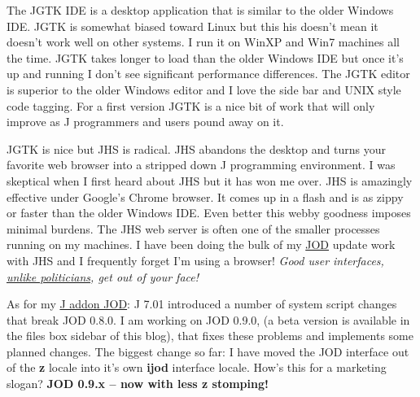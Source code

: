 The JGTK IDE is a desktop application that is similar to the older
Windows IDE. JGTK is somewhat biased toward Linux but this his doesn't
mean it doesn't work well on other systems. I run it on WinXP and Win7
machines all the time. JGTK takes longer to load than the older Windows
IDE but once it's up and running I don't see significant performance
differences. The JGTK editor is superior to the older Windows editor and
I love the side bar and UNIX style code tagging. For a first version
JGTK is a nice bit of work that will only improve as J programmers and
users pound away on it.

JGTK is nice but JHS is radical. JHS abandons the desktop and turns your
favorite web browser into a stripped down J programming environment. I
was skeptical when I first heard about JHS but it has won me over. JHS
is amazingly effective under Google's Chrome browser. It comes up in a
flash and is as zippy or faster than the older Windows IDE. Even better
this webby goodness imposes minimal burdens. The JHS web server is often
one of the smaller processes running on my machines. I have been doing
the bulk of my
\href{https://github.com/bakerjd99/jod/blob/master/joddocument/pdfdoc/jod.pdf}{JOD}
update work with JHS and I frequently forget I'm using a browser!
\emph{Good user
interfaces,} \emph{\href{http://www.nationalreview.com/articles/225959/coming-obama-thugocracy/michael-barone}{unlike
politicians}}\emph{, get out of your face!}

As for my \href{http://www.jsoftware.com/jwiki/Addons/general/jod}{J
addon JOD}: J 7.01 introduced a number of system script changes that
break JOD 0.8.0. I am working on JOD 0.9.0, (a beta version is available
in the files box sidebar of this blog), that fixes these problems and
implements some planned changes. The biggest change so far: I have moved
the JOD interface out of the \textbf{z} locale into it's own
\textbf{ijod} interface locale. How's this for a marketing slogan?
\textbf{JOD 0.9.x -- now with less z stomping!}




%